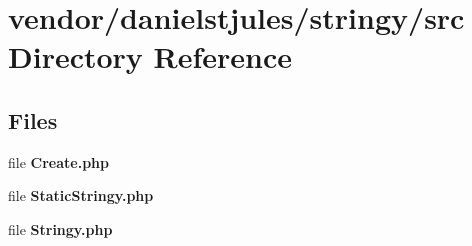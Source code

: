 \section{vendor/danielstjules/stringy/src Directory Reference}
\label{dir_d4975a9b8007eaedb9eb22e7ab83bb3b}
\subsection*{Files}
\begin{DoxyCompactItemize}
\item 
file {\bf Create.\+php}
\item 
file {\bf Static\+Stringy.\+php}
\item 
file {\bf Stringy.\+php}
\end{DoxyCompactItemize}
